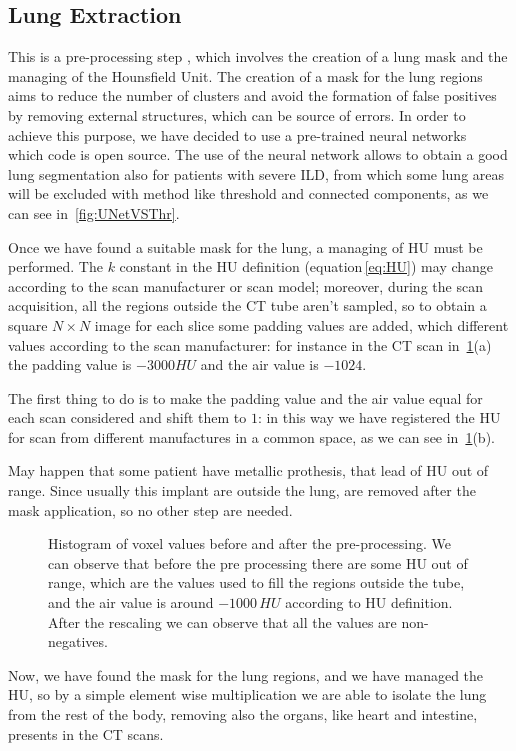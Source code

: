 \documentclass{standalone}
\begin{document}
	\subsection{Lung Extraction}
	This is a pre-processing step , which involves the creation of a lung mask and the managing of the Hounsfield Unit. The creation of a mask for the lung regions aims to reduce the number of clusters and avoid the formation of false positives by removing external structures, which can be source of errors. In order to achieve this purpose, we have decided to use a pre-trained neural networks~\cite{REP:lungmask} which code is open source. The use of the neural network allows to obtain a good lung segmentation also for patients with severe ILD, from which some lung areas will be excluded with method like threshold and connected components, as we can see in \figurename\,\ref{fig:UNetVSThr}. 
	
	Once we have found a suitable mask for the lung, a managing of HU must be performed. The $k$ constant in the HU definition (equation\,\ref{eq:HU}) may change according to the scan manufacturer or scan model; moreover, during the scan acquisition, all the regions outside the CT tube aren't sampled, so to obtain a square $N\times N$ image for each slice some padding values are added, which different values according to the scan manufacturer: for instance in the CT scan in \figurename\,\ref{fig:Pre-Processing}(a) the padding value is $-3000 HU$ and the air value is $-1024$. 
	
	The first thing to do is to make the padding value and the air value equal for each scan considered and shift them to $1$: in this way we have registered the HU for scan from different manufactures in a common space, as we can see in \figurename\,\ref{fig:Pre-Processing}(b).
	
	 May happen that some patient have metallic prothesis, that lead of HU out of range. Since usually this implant are outside the lung, are removed after the mask application, so no other step are needed.
	 
		\begin{figure}[h!]
		\centering
		\caption{Histogram of voxel values before and after the pre-processing. We can observe that before the pre processing there are some HU out of range, which are the values used to fill the regions outside the tube, and the air value is around $-1000\,HU$ according to HU definition. After the rescaling we can observe that all the values are non-negatives.}\label{fig:Pre-Processing}
	\end{figure}
	Now, we have found the mask for the lung regions, and we have managed the HU, so by a simple element wise multiplication we are able to isolate the lung from the rest of the body, removing also the organs, like heart and intestine, presents in the CT scans.\\
	
\end{document}
